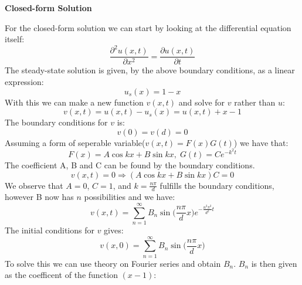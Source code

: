 \documentclass[a4paper,11pt]{article}
\newcommand{\prtl}{\partial}
\newcommand{\secti}[1]{\begin{center} \Large\bf{{#1}} \end{center}}
\begin{document}
\secti{Closed-form Solution}
    For the closed-form solution we can start by looking at the differential equation itself:
    \begin{equation*}
        \frac{\prtl^2 u(x,t)}{\prtl x^2} = \frac{\prtl u(x,t)}{\prtl t}
    \end{equation*}
    The steady-state solution is given, by the above boundary conditions, as a linear expression:
    \begin{equation*}
        u_s(x) = 1 - x
    \end{equation*}
    With this we can make a new function $v(x,t)$ and solve for $v$ rather than $u$:
    \begin{equation*}
        v(x,t) = u(x,t) - u_s(x) = u(x,t) + x - 1
    \end{equation*}
    The boundary conditions for $v$ is:
    \begin{equation*}
        v(0) = v(d) = 0
    \end{equation*}
    Assuming a form of seperable variable($v(x,t) = F(x)G(t)$) we have that:
    \begin{equation*}
        F(x) = A\cos{kx} + B\sin{kx},\; G(t) = Ce^{-k^2 t}
    \end{equation*}
    The coefficient A, B and C can be found by the boundary conditions.
    \begin{equation*}
        v(x,t) = 0 \Rightarrow (A\cos{kx}+B\sin{kx})C = 0
    \end{equation*}
    We observe that $A=0$, $C=1$, and $k=\frac{n\pi}{d}$ fulfills the boundary conditions, however B now has $n$ possibilities and we have:
    \begin{equation*}
        v(x,t) = \sum_{n=1}^{\infty}B_n\sin{\bigg(\frac{n\pi}{d}x\bigg)}e^{-\frac{n^2\pi^2}{d^2}t}
    \end{equation*}
    The initial conditions for $v$ gives:
    \begin{equation*}
        v(x,0) = \sum_{n=1}^{\infty}B_n\sin{\bigg(\frac{n\pi}{d}x\bigg)}
    \end{equation*}
    To solve this we can use theory on Fourier series and obtain $B_n$. $B_n$ is then given as the coefficent of the function $(x-1)$:
\end{document}
